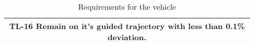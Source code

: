 \begin{table}
\begin{tabular}{|c|}
	\\
	\cellcolor{blue!15} TL-16 Remain on it's guided trajectory with less than 0.1\% deviation.
	
	\\
	\hline
\end{tabular}
\caption{Requirements for the vehicle}
\end{table}